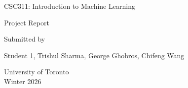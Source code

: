 \documentclass[12pt]{article}
\begin{document}
\begin{titlepage}
    \centering
    \vspace*{3cm}

    {\Large {CSC311: Introduction to Machine Learning} \par}
    \vspace{1cm}
    
    {\Large {Project Report} \par}
    \vspace{1cm}
    
    \vspace{3cm}
    
    {\large Submitted by \par}
    
    
    \vspace{0.5cm}
    {\large Student 1, Trishul Sharma, George Ghobros, Chifeng Wang \par}
    
    \vfill
    {\large University of Toronto \\ Winter 2026 \par}
\end{titlepage}
\clearpage
\setcounter{page}{1}





\end{document}
